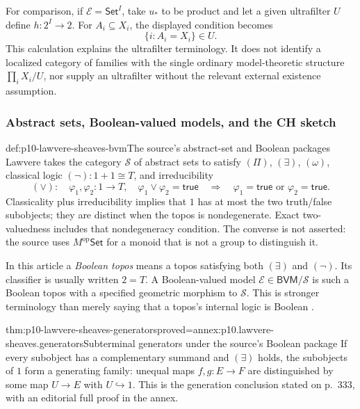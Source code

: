 For comparison, if \(\mathcal E=\mathsf{Set}^I\), take
\(u_*\) to be product and let a given ultrafilter \(U\) define
\(h:2^I\to2\).  For \(A_i\subseteq X_i\), the displayed
condition becomes
\[
                     \{i:A_i=X_i\}\in U.
\]
This calculation explains the ultrafilter terminology.  It does not
identify a localized category of families with the single ordinary
model-theoretic structure \(\prod_i X_i/U\), nor supply an
ultrafilter without the relevant external existence assumption.



\subsubsection{Abstract sets, Boolean-valued models, and the CH sketch}

\begin{hbdefinition}{def:p10-lawvere-sheaves-bvm}{The source's abstract-set and Boolean packages}
Lawvere takes the category \(\mathcal S\) of abstract sets to
satisfy \((\Pi)\), \((\exists)\), \((\omega)\), classical
logic \((\neg):1+1\cong T\), and irreducibility
\[
 (\lor):\quad\varphi_1,\varphi_2:1\to T,
 \quad\varphi_1\lor\varphi_2=\mathsf{true}
 \quad\Longrightarrow\quad
 \varphi_1=\mathsf{true}\text{ or }\varphi_2=\mathsf{true}.
\]
Classicality plus irreducibility implies that \(1\) has at most the
two truth/false subobjects; they are distinct when the topos is
nondegenerate.  Exact two-valuedness includes that nondegeneracy
condition.  The converse is not asserted: the source uses
\(M^{\mathrm{op}}\mathsf{Set}\) for a monoid that is not a
group to distinguish it.

In this article a \emph{Boolean topos} means a topos satisfying
both \((\exists)\) and \((\neg)\).  Its classifier is usually
written \(2=T\).  A Boolean-valued model
\(\mathcal E\in\mathsf{BVM}/\mathcal S\) is such a Boolean
topos with a specified geometric morphism to \(\mathcal S\).
This is stronger terminology than merely saying that a topos's
internal logic is Boolean \cite[pp.~332--333]{Lawvere1970}.
\end{hbdefinition}

\begin{hbtheorem}{thm:p10-lawvere-sheaves-generators}{proved=annex:p10.lawvere-sheaves.generators}{Subterminal generators under the source's Boolean package}
If every subobject has a complementary summand and
\((\exists)\) holds, the subobjects of \(1\) form a generating
family: unequal maps \(f,g:E\to F\) are distinguished by
some map \(U\to E\) with \(U\hookrightarrow1\).
This is the generation conclusion stated on p.~333, with an
editorial full proof in the annex.
\end{hbtheorem}

